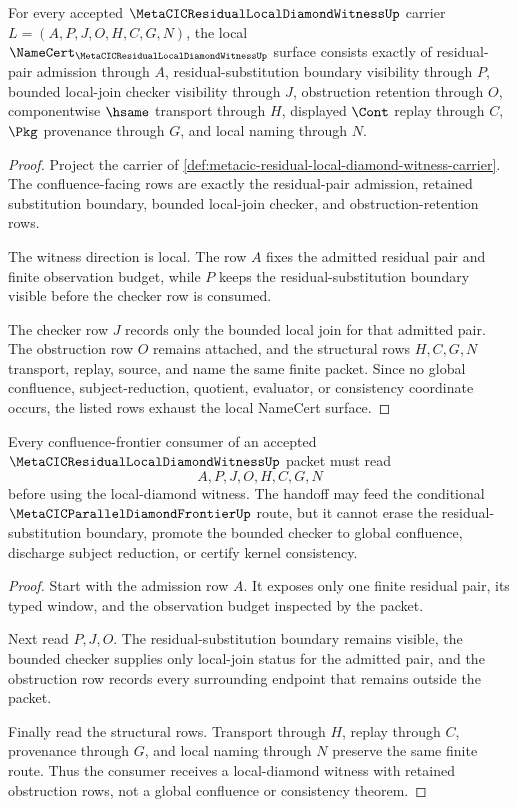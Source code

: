 \begin{theorem}
\label{thm:metacic-residual-local-diamond-witness-obligations}
For every accepted $\MetaCICResidualLocalDiamondWitnessUp$ carrier $L=(A,P,J,O,H,C,G,N)$, the local $\NameCert_{\MetaCICResidualLocalDiamondWitnessUp}$ surface consists exactly of residual-pair admission through $A$, residual-substitution boundary visibility through $P$, bounded local-join checker visibility through $J$, obstruction retention through $O$, componentwise $\hsame$ transport through $H$, displayed $\Cont$ replay through $C$, $\Pkg$ provenance through $G$, and local naming through $N$.
\end{theorem}
\begin{proof}
Project the carrier of \autoref{def:metacic-residual-local-diamond-witness-carrier}. The confluence-facing rows are exactly the residual-pair admission, retained substitution boundary, bounded local-join checker, and obstruction-retention rows.

The witness direction is local. The row $A$ fixes the admitted residual pair and finite observation budget, while $P$ keeps the residual-substitution boundary visible before the checker row is consumed.

The checker row $J$ records only the bounded local join for that admitted pair. The obstruction row $O$ remains attached, and the structural rows $H,C,G,N$ transport, replay, source, and name the same finite packet. Since no global confluence, subject-reduction, quotient, evaluator, or consistency coordinate occurs, the listed rows exhaust the local NameCert surface.
\end{proof}

\begin{theorem}
\label{thm:metacic-residual-local-diamond-nonescape}
Every confluence-frontier consumer of an accepted $\MetaCICResidualLocalDiamondWitnessUp$ packet must read
$$
A,P,J,O,H,C,G,N
$$
before using the local-diamond witness. The handoff may feed the conditional $\MetaCICParallelDiamondFrontierUp$ route, but it cannot erase the residual-substitution boundary, promote the bounded checker to global confluence, discharge subject reduction, or certify kernel consistency.
\end{theorem}
\begin{proof}
Start with the admission row $A$. It exposes only one finite residual pair, its typed window, and the observation budget inspected by the packet.

Next read $P,J,O$. The residual-substitution boundary remains visible, the bounded checker supplies only local-join status for the admitted pair, and the obstruction row records every surrounding endpoint that remains outside the packet.

Finally read the structural rows. Transport through $H$, replay through $C$, provenance through $G$, and local naming through $N$ preserve the same finite route. Thus the consumer receives a local-diamond witness with retained obstruction rows, not a global confluence or consistency theorem.
\end{proof}

